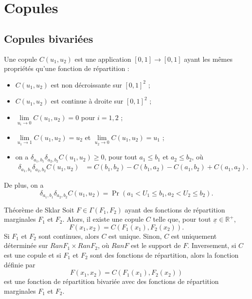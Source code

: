 \chapter{Copules}

\section{Copules bivariées}

\begin{definition}{}{}
	Une copule $C(u_1, u_2)$ est une application $[0, 1] \to [0, 1]$ ayant les mêmes propriétés qu'une fonction de répartition : 
	\begin{itemize}
		\item $C(u_1, u_2)$ est non décroissante sur $[0, 1]^2$ ;
		\item $C(u_1, u_2)$ est continue à droite sur $[0, 1]^2$ ;
		\item $\lim\limits_{u_i \to 0} C(u_1, u_2)  = 0$ pour $i = 1, 2$ ;
		\item $\lim\limits_{u_1 \to 1} C(u_1, u_2)  = u_2$ et $\lim\limits_{u_2 \to 0} C(u_1, u_2)  = u_1$ ;
		\item on a $\delta_{a_1, b_1} \delta_{a_2, b_2} C(u_1, u_2) \geq 0$, pour tout $a_1 \leq b_1$ et $a_2 \leq b_2$, où 
		\begin{align*}
			\delta_{a_1, b_1} \delta_{a_2, b_2} C(u_1, u_2) &= C(b_1, b_2) - C(b_1, a_2) - C(a_1, b_2) + C(a_1, a_2). 
		\end{align*}
	\end{itemize}
De plus, on a 
$$\delta_{a_1, b_1} \delta_{a_2, b_2} C(u_1, u_2) = \Pr(a_1 < U_1\leq b_1, a_2<U_2 \leq b_2). $$
\end{definition}

\begin{theoreme}{Théorème de Sklar}{}
	Soit $F \in \Gamma(F_1, F_2)$ ayant des fonctions de répartition marginales $F_1$ et $F_2$. Alors, il existe une copule $C$ telle que, pour tout $\underline{x} \in \mathbb{R}^+$, 
	$$F(x_1, x_2) = C(F_1(x_1), F_2(x_2)).$$
	Si $F_1$ et $F_2$ sont continues, alors $C$ est unique. Sinon, $C$ est uniquement déterminée sur $RanF_1 \times Ran F_2$, où $RanF$ est le support de $F$. Inversement, si $C$ est une copule et si $F_1$ et $F_2$ sont des fonctions de répartition, alors la fonction définie par $$F(x_1, x_2) = C(F_1(x_1), F_2(x_2))$$ est une fonction de répartition bivariée avec des fonctions de répartition marginales $F_1$ et $F_2$. 
\end{theoreme}

